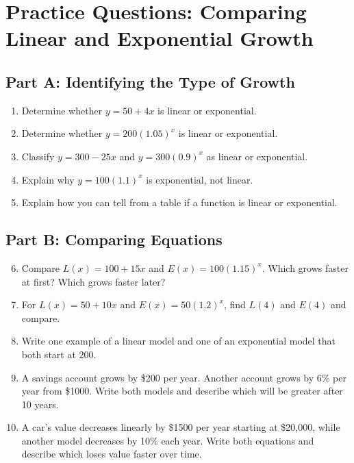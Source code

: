 \documentclass[14pt]{extarticle}
\begin{document}
\newpage


\section*{Practice Questions: Comparing Linear and Exponential Growth}

\subsection*{Part A: Identifying the Type of Growth}
\begin{enumerate}
  \item Determine whether \(y = 50 + 4x\) is linear or exponential.
  \item Determine whether \(y = 200(1.05)^x\) is linear or exponential.
  \item Classify \(y = 300 - 25x\) and \(y = 300(0.9)^x\) as linear or exponential.
  \item Explain why \(y = 100(1.1)^x\) is exponential, not linear.
  \item Explain how you can tell from a table if a function is linear or exponential.
\end{enumerate}

\subsection*{Part B: Comparing Equations}
\begin{enumerate}
  \setcounter{enumi}{5}
  \item Compare \(L(x) = 100 + 15x\) and \(E(x) = 100(1.15)^x\).  
  Which grows faster at first? Which grows faster later?
  \item For \(L(x) = 50 + 10x\) and \(E(x) = 50(1.2)^x\), find \(L(4)\) and \(E(4)\) and compare.
  \item Write one example of a linear model and one of an exponential model that both start at 200.
  \item A savings account grows by \$200 per year. Another account grows by 6\% per year from \$1000.  
  Write both models and describe which will be greater after 10 years.
  \item A car’s value decreases linearly by \$1500 per year starting at \$20,000, while another model decreases by 10\% each year.  
  Write both equations and describe which loses value faster over time.
\end{enumerate}
\end{document}
